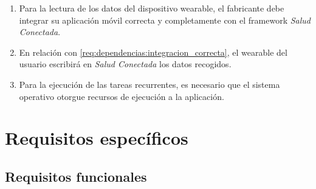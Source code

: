         \begin{enumerate}[label=\textbf{DEP-\arabic*}]
            \item \label{req:dependencias:integracion_correcta} Para la lectura de los datos del dispositivo \gls{wearable}, el fabricante debe integrar su aplicación móvil correcta y completamente con el \gls{framework} \textit{Salud Conectada}.

            \item En relación con \ref{req:dependencias:integracion_correcta}, el \gls{wearable} del usuario escribirá en \textit{Salud Conectada} los datos recogidos.
            \item \label{req:dependencias:planificacion} Para la ejecución de las tareas recurrentes, es necesario que el sistema operativo otorgue recursos de ejecución a la aplicación.
        \end{enumerate}

\section{Requisitos específicos}
    \label{req:especificos}

    \subsection{Requisitos funcionales}
        \label{req:especificos:funcionales}



